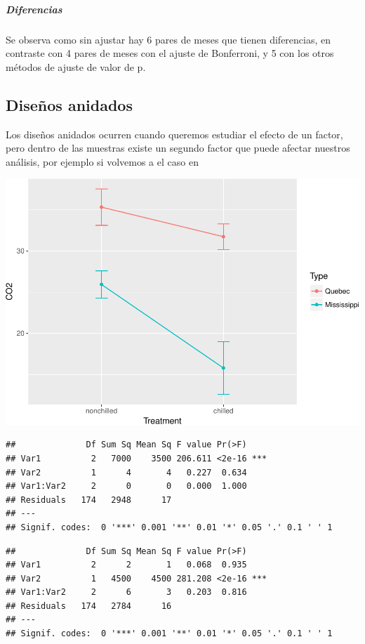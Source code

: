 \documentclass[]{article}
\let\oldsubparagraph\subparagraph
\renewcommand{\subparagraph}[1]{\oldsubparagraph{#1}\mbox{}}
\begin{document}
\subparagraph{Diferencias}\label{diferencias}

Se observa como sin ajustar hay 6 pares de meses que tienen diferencias,
en contraste con 4 pares de meses con el ajuste de Bonferroni, y 5 con
los otros métodos de ajuste de valor de p.

\subsection{Diseños anidados}\label{disenos-anidados}

Los diseños anidados ocurren cuando queremos estudiar el efecto de un
factor, pero dentro de las muestras existe un segundo factor que puede
afectar nuestros análisis, por ejemplo si volvemos a el caso en

\includegraphics{Guia6_files/figure-latex/unnamed-chunk-7-1.pdf}

\begin{verbatim}
##              Df Sum Sq Mean Sq F value Pr(>F)    
## Var1          2   7000    3500 206.611 <2e-16 ***
## Var2          1      4       4   0.227  0.634    
## Var1:Var2     2      0       0   0.000  1.000    
## Residuals   174   2948      17                   
## ---
## Signif. codes:  0 '***' 0.001 '**' 0.01 '*' 0.05 '.' 0.1 ' ' 1
\end{verbatim}

\begin{verbatim}
##              Df Sum Sq Mean Sq F value Pr(>F)    
## Var1          2      2       1   0.068  0.935    
## Var2          1   4500    4500 281.208 <2e-16 ***
## Var1:Var2     2      6       3   0.203  0.816    
## Residuals   174   2784      16                   
## ---
## Signif. codes:  0 '***' 0.001 '**' 0.01 '*' 0.05 '.' 0.1 ' ' 1
\end{verbatim}
\end{document}
